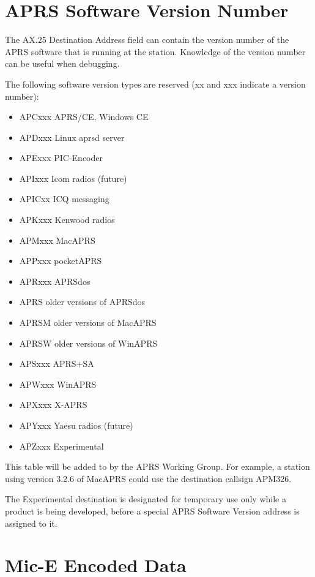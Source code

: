 \section{APRS Software Version Number}

The AX.25 Destination Address field can contain the version number of
the APRS software that is running at the station. Knowledge of the
version number can be useful when debugging.

The following software version types are reserved (xx and xxx indicate
a version number):

\begin{itemize}

\item APCxxx APRS/CE, Windows CE
\item APDxxx Linux aprsd server
\item APExxx PIC-Encoder
\item APIxxx Icom radios (future)
\item APICxx ICQ messaging
\item APKxxx Kenwood radios
\item APMxxx MacAPRS
\item APPxxx pocketAPRS
\item APRxxx APRSdos
\item APRS older versions of APRSdos
\item APRSM older versions of MacAPRS
\item APRSW older versions of WinAPRS
\item APSxxx APRS+SA
\item APWxxx WinAPRS
\item APXxxx X-APRS
\item APYxxx Yaesu radios (future)
\item APZxxx Experimental

\end{itemize}

This table will be added to by the APRS Working Group.
For example, a station using version 3.2.6 of MacAPRS could use the
destination callsign \textsf{APM326}.

The Experimental destination is designated for temporary use only while a
product is being developed, before a special APRS Software Version address
is assigned to it.

\section {Mic-E Encoded Data}

